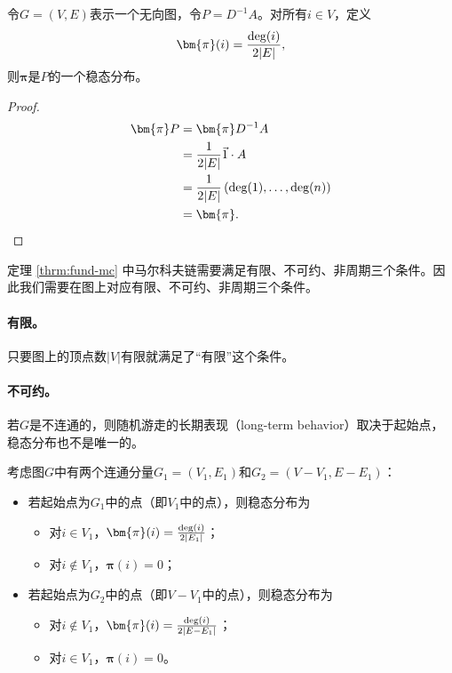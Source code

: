 \begin{lemma}
    \label{lemma:sta-dist-graoh}
    令$G=(V,E)$表示一个无向图，令$P=D^{-1}A$。对所有$i\in V$，定义
    \[
        \bm{\pi}(i)=\frac{\textup{deg}(i)}{2|E|},
    \]
    则$\bm{\pi}$是$P$的一个稳态分布。
            
    \begin{proof}
        \begin{align*}
            \bm{\pi}P&=\bm{\pi}D^{-1}A\\
            &=\frac{1}{2|E|}\vec{1}\cdot  A\\
            &=\frac{1}{2|E|}\left(\textup{deg}(1),\dots,\textup{deg}(n)\right)\\
            &=\bm{\pi}.
        \end{align*}
    \end{proof}
\end{lemma}

定理 \ref{thrm:fund-mc} 中马尔科夫链需要满足有限、不可约、非周期三个条件。因此我们需要在图上对应有限、不可约、非周期三个条件。

\paragraph{有限。}只要图上的顶点数$|V|$有限就满足了“有限”这个条件。

\paragraph{不可约。}若$G$是不连通的，则随机游走的长期表现（long-term behavior）取决于起始点，稳态分布也不是唯一的。
        
考虑图$G$中有两个连通分量$G_1=(V_1,E_1)$和$G_2=(V-V_1,E-E_1)$：
\begin{itemize}
    \item 若起始点为$G_1$中的点（即$V_1$中的点），则稳态分布为
    \begin{itemize}
        \item 对$i\in V_1$，$\bm{\pi}(i)=\frac{\textup{deg}(i)}{2|E_1|}$；
        \item 对$i\notin V_1$，$\bm{\pi}(i)=0$；
    \end{itemize}

    \item 若起始点为$G_2$中的点（即$V-V_1$中的点），则稳态分布为
    \begin{itemize}
        \item 对$i\notin V_1$，$\bm{\pi}(i)=\frac{\textup{deg}(i)}{2|E-E_1|}$；
        \item 对$i\in V_1$，$\bm{\pi}(i)=0$。
    \end{itemize}
\end{itemize}

